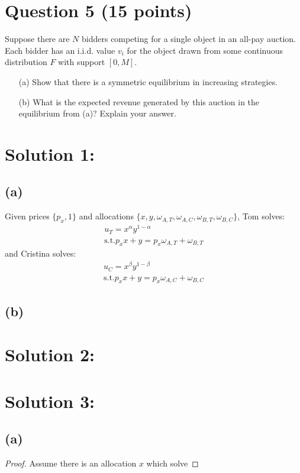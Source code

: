 \documentclass[10pt,a4paper]{article}
\begin{document}
\section*{Question 5 (15 points)}
Suppose there are $N$ bidders competing for a single object in an all-pay auction. Each bidder has an i.i.d. value $v_i$ for the object drawn from some continuous distribution $F$ with support $[0, M]$.
\begin{enumerate}
    \item[(a)] Show that there is a symmetric equilibrium in increasing strategies.
    \item[(b)] What is the expected revenue generated by this auction in the equilibrium from (a)? Explain your answer.
\end{enumerate}
\section*{Solution 1:}
  \subsection*{(a)}
    Given prices $\{p_x, 1\}$ and allocations $\{x,y,\omega_{A,T}, \omega_{A,C}, \omega_{B, T}, \omega_{B,C}\}$, 
    Tom solves:
    \begin{gather*}
        u_T = x^{\alpha}y^{1-\alpha} \\
        \text{s.t.}
        p_xx + y = p_x\omega_{A,T} + \omega_{B,T}
    \end{gather*}
    and Cristina solves:
    \begin{gather*}
        u_C = x^{\beta}y^{1-\beta} \\
        \text{s.t.}
        p_xx + y = p_x\omega_{A,C} + \omega_{B,C}
    \end{gather*}
  \subsection*{(b)}
    
\section*{Solution 2:}
\section*{Solution 3:}
  \subsection*{(a)}
    \begin{proof}
      Assume there is an allocation $x$ which solve 
    \end{proof}
\end{document}
